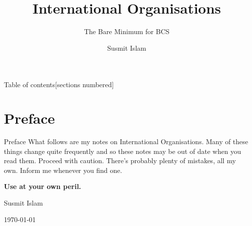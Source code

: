 \documentclass[
  12pt,
  ignorenonframetext,
  progressbar=frametitle]{beamer}
\title{International Organisations}
\subtitle{The Bare Minimum for BCS}
\author{Susmit Islam}
\date{}
\institute{Sir Salimullah Medical College}
\begin{document}
\frame{\titlepage}
\begin{frame}[t,allowframebreaks]
{Table of contents}[sections numbered]

\tableofcontents[hideallsubsections]
\end{frame}

\section{Preface}
\begin{frame}[allowframebreaks]
{Preface}
\protect\hypertarget{preface}{}
What follows are my notes on International Organisations. Many of these
things change quite frequently and so these notes may be out of date
when you read them. Proceed with caution. There's probably plenty of
mistakes, all my own. Inform me whenever you find one.\newline

\textbf{Use at your own peril.}

\hfill Susmit Islam

\hfill\today
\end{frame}
\end{document}
